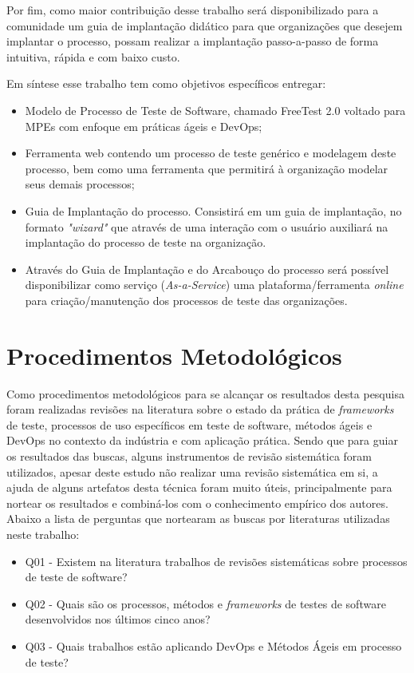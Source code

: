 Por fim, como maior contribuição desse trabalho será disponibilizado para a comunidade um guia de implantação didático para que organizações que desejem implantar o processo, possam realizar a implantação passo-a-passo de forma intuitiva, rápida e com baixo custo. 

Em síntese esse trabalho tem como objetivos específicos entregar:

\begin{itemize}
    \item Modelo de Processo de Teste de Software, chamado FreeTest 2.0 voltado para MPEs com enfoque em práticas ágeis e DevOps;
    \item Ferramenta web contendo um processo de teste genérico e modelagem deste processo, bem como uma ferramenta que permitirá à organização modelar seus demais processos;
    \item Guia de Implantação do processo. Consistirá em um guia de implantação, no formato \textit{"\textit{wizard}"} que através de uma interação com o usuário auxiliará na implantação do processo de teste na organização. 
    \item Através do Guia de Implantação e do Arcabouço do processo será possível disponibilizar como serviço (\textit{As-a-Service}) uma plataforma/ferramenta \textit{online} para criação/manutenção dos processos de teste das organizações.
\end{itemize}

\section{Procedimentos Metodológicos}
\label{sec:procedimentos}

Como procedimentos metodológicos para se alcançar os resultados desta pesquisa foram realizadas revisões na literatura sobre o estado da prática de \textit{frameworks} de teste, processos de uso específicos em teste de software, métodos ágeis e DevOps no contexto da indústria e com aplicação prática. Sendo que para guiar os resultados das buscas, alguns instrumentos de revisão sistemática foram utilizados, apesar deste estudo não realizar uma revisão sistemática em si, a ajuda de alguns artefatos desta técnica foram muito úteis, principalmente para nortear os resultados e combiná-los com o conhecimento empírico dos autores. Abaixo a lista de perguntas que nortearam as buscas por literaturas utilizadas neste trabalho:

\begin{itemize}
    \item Q01 - Existem na literatura trabalhos de revisões sistemáticas sobre processos de teste de software?
    \item Q02 - Quais são os processos, métodos e \textit{frameworks} de testes de software desenvolvidos nos últimos cinco anos?
    \item Q03 - Quais trabalhos estão aplicando DevOps e Métodos Ágeis em processo de teste?
\end{itemize}

